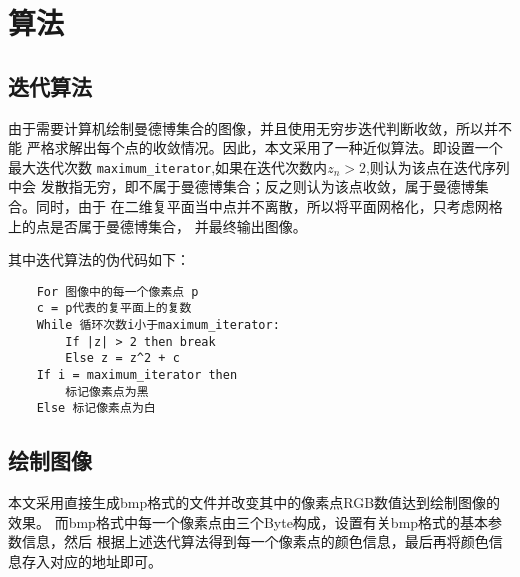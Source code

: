\section{算法}
\subsection{迭代算法}
由于需要计算机绘制曼德博集合的图像，并且使用无穷步迭代判断收敛，所以并不能
严格求解出每个点的收敛情况。因此，本文采用了一种近似算法。即设置一个最大迭代次数
\verb|maximum_iterator|,如果在迭代次数内$z_n>2$,则认为该点在迭代序列中会
发散指无穷，即不属于曼德博集合；反之则认为该点收敛，属于曼德博集合。同时，由于
在二维复平面当中点并不离散，所以将平面网格化，只考虑网格上的点是否属于曼德博集合，
并最终输出图像。
\par 
其中迭代算法的伪代码如下：
\begin{verbatim}
    For 图像中的每一个像素点 p
    c = p代表的复平面上的复数
    While 循环次数i小于maximum_iterator:
        If |z| > 2 then break
        Else z = z^2 + c
    If i = maximum_iterator then
        标记像素点为黑
    Else 标记像素点为白
\end{verbatim}

\subsection{绘制图像}
本文采用直接生成bmp格式的文件并改变其中的像素点RGB数值达到绘制图像的效果。
而bmp格式中每一个像素点由三个Byte构成，设置有关bmp格式的基本参数信息，然后
根据上述迭代算法得到每一个像素点的颜色信息，最后再将颜色信息存入对应的地址即可。

